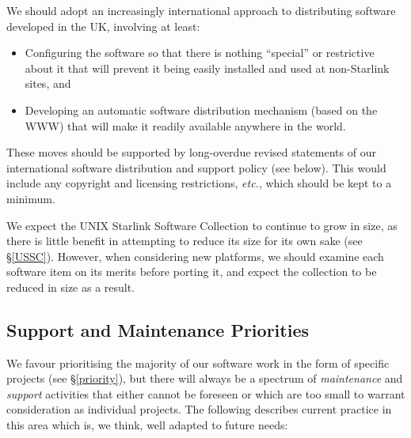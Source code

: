 \documentclass[twoside,11pt]{article}
\newcommand{\htmlref}[2]{#1}
\newcommand{\latex}[1]{#1}
\newcommand{\xref}[3]{#1}
\newcommand{\qt}[1]{``#1''}
\newcommand{\st}[1]{{\em{#1}}}
\newcommand{\qt}[1]{{\tt{"}}#1{\tt{"}}}
\newcommand{\mnt}[1]{\htmlref{#1}{maintenance}}
\newcommand{\spt}[1]{\htmlref{#1}{support}}
\newcommand{\usscref}[1]{\xref{#1}{sun1}{}}
\begin{document}
We should adopt an increasingly international approach to distributing
software developed in the UK, involving at least:
\begin{itemize}
\item Configuring the software so that there is nothing \qt{special}
or restrictive about it that will prevent it being easily installed
and used at non-Starlink sites, and
\item Developing an automatic software distribution mechanism (based on the
WWW) that will make it readily available anywhere in the world.
\end{itemize}

These moves should be supported by long-overdue revised statements of
our \htmlref{international software distribution and support
policy}{international}\latex{ (see below)}. This would include any 
copyright and licensing
restrictions, \st{etc.}, which should be kept to a minimum.

We expect the \usscref{UNIX Starlink Software Collection} to continue
to grow in size, as there is \htmlref{little benefit}{USSC} in
attempting to reduce its size for its own sake\latex{ (see \S\ref{USSC})}. 
However, when considering new platforms, we should examine each
software item on its merits before porting it, and expect the
collection to be reduced in size as a result.

\subsection{Support and Maintenance Priorities}

We favour \htmlref{prioritising}{priority} the majority of our
software work in the form of specific projects\latex{ (see
\S\ref{priority})}, but there will always be a spectrum
of \st{\mnt{maintenance}} and \st{\spt{support}} activities that
either cannot be foreseen or which are too small to warrant
consideration as individual projects.  The following describes current
practice in this area which is, we think, well adapted to future
needs:
\end{document}
